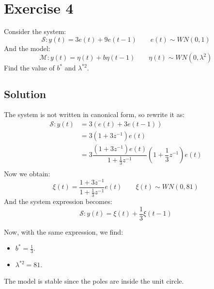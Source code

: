 \section{Exercise 4}

Consider the system: 
\[\mathcal{S}:y(t)=3e(t)+9e(t-1)\qquad e(t)\sim WN(0,1)\]
And the model: 
\[\mathcal{M}:y(t)=\eta(t)+b\eta(t-1)\qquad \eta(t)\sim WN(0,\lambda^2)\]
Find the value of $b^\ast$ and $\lambda^{\ast 2}$. 

\subsection*{Solution}
The system is not written in canonical form, so rewrite it as:
\begin{align*}
    \mathcal{S}:y(t)    &=3\left(e(t)+3e(t-1)\right) \\
                        &=3\left(1+3z^{-1}\right)e(t) \\
                        &=3\dfrac{\left(1+3z^{-1}\right)e(t)}{1+\frac{1}{3}z^{-1}}\left(1+\dfrac{1}{3}z^{-1}\right)e(t) \\           
\end{align*}
Now we obtain:
\[\xi(t)=\dfrac{1+3z^{-1}}{1+\frac{1}{3}z^{-1}}e(t)\qquad \xi(t)\sim WN(0,81)\]
And the system expression becomes:
\[\mathcal{S}:y(t)=\xi(t)+\dfrac{1}{3}\xi(t-1)\]

Now, with the same expression, we find:
\begin{itemize}
    \item $b^\ast=\frac{1}{3}$.
    \item $\lambda^{\ast 2}=81$.
\end{itemize}
The model is stable since the poles are inside the unit circle.
